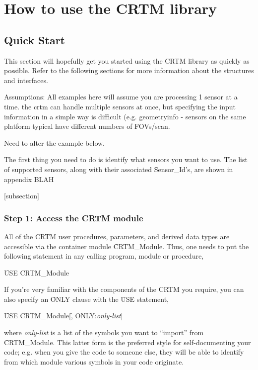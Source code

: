\chapter{How to use the CRTM library}
\section{Quick Start}
This section will hopefully get you started using the CRTM library as quickly as possible. Refer to the following sections for more information about the structures and interfaces.

Assumptions:
All examples here will assume you are processing 1 sensor at a time. the crtm can handle multiple sensors at once, but specifying the input information in a simple way is difficult (e.g. geometryinfo - sensors on the same platform typical have different numbers of FOVs/scan.


Need to alter the example below.

The first thing you need to do is identify what sensors you want to use. The list of supported sensors, along with their associated \f{Sensor\_Id}'s, are shown in appendix BLAH


[subsection]

\subsection{Step 1: Access the CRTM module}
All of the CRTM user procedures, parameters, and derived data types are accessible via the container module \f{CRTM\_Module}. Thus, one needs to put the following statement in any calling program, module or procedure,

\qquad\f{USE CRTM\_Module}

If you're very familiar with the components of the CRTM you require, you can also specify an \f{ONLY} clause with the \f{USE} statement,

\qquad\f{USE CRTM\_Module}[\f{, ONLY:}\textit{only-list}]

where \textit{only-list} is a list of the symbols you want to ``import'' from \f{CRTM\_Module}. This latter form is the preferred style for self-documenting your code; e.g. when you give the code to someone else, they will be able to identify from which module various symbols in your code originate.

